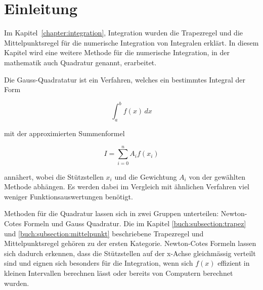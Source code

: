 %
%
%
\section{Einleitung\label{quadratur:section:einleitung}}

Im Kapitel~\ref{chapter:integration}, Integration wurden die 
Trapezregel und die Mittelpunktsregel für die numerische Integration 
von Integralen erklärt. 
In diesem Kapitel wird eine weitere Methode für die numerische Integration,
in der mathematik auch Quadratur genannt, erarbeitet.

Die Gauss-Quadratatur ist ein Verfahren, welches ein bestimmtes Integral der Form

\begin{equation}
    \int_{a}^{b} f(x) \,dx
\end{equation}

mit der approximierten Summenformel 

\begin{equation}
    I = \sum_{i=0}^{n} A_i f(x_i)
\end{equation}

annähert, wobei die Stützstellen $x_i$ und die Gewichtung $A_i$ von der gewählten 
Methode abhängen. 
Es werden dabei im Vergleich mit ähnlichen Verfahren viel weniger Funktionsauswertungen benötigt.

Methoden für die Quadratur lassen sich in zwei Gruppen unterteilen: 
Newton-Cotes Formeln und Gauss Quadratur.
Die im Kapitel \ref{buch:subsection:trapez} und \ref{buch:subsection:mittelpunkt} beschriebene
Trapezregel und Mittelpunktsregel gehören zu der ersten Kategorie.
Newton-Cotes Formeln lassen sich dadurch erkennen, dass die Stützstellen auf der x-Achse 
gleichmässig verteilt sind und eignen sich besonders für die Integration, wenn sich $f(x)$ 
effizient in kleinen Intervallen berechnen lässt oder bereits von Computern berechnet wurden.

\newpage





